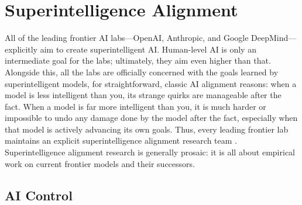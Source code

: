 \section{Superintelligence Alignment}


All of the leading frontier AI labs---OpenAI, Anthropic, and Google
DeepMind---explicitly aim to create superintelligent AI. Human-level AI is only
an intermediate goal for the labs; ultimately, they aim even higher than that.
Alongside this, all the labs are officially concerned with the goals learned by
superintelligent models, for straightforward, classic AI alignment reasons:
when a model is less intelligent than you, its strange quirks are manageable
after the fact. When a model is far more intelligent than you, it is much
harder or impossible to undo any damage done by the model after the fact,
especially when that model is actively advancing its own goals. Thus, every
leading frontier lab maintains an explicit superintelligence alignment research
team \cite{leike2023superalignment,anthropic2025rsp}. Superintelligence
alignment research is generally prosaic: it is all about empirical work on
current frontier models and their successors.

\subsection{AI Control}

